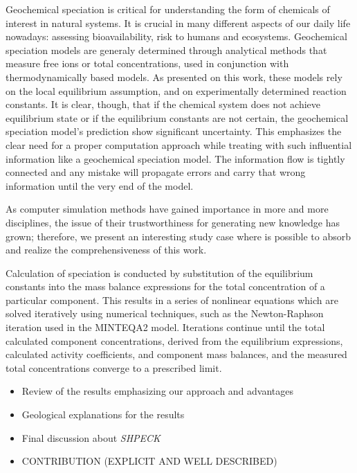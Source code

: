 \documentclass[ppgc,mestrado,English]{iiufrgs}
\begin{document}
Geochemical speciation is critical for understanding the form of chemicals of interest in natural systems. It is crucial in many different aspects of our daily life nowadays: assessing bioavailability, risk to humans and ecosystems. Geochemical speciation models are generaly determined through analytical methods that measure free ions or total concentrations, used in conjunction with thermodynamically based models. As presented on this work, these models rely on the local equilibrium assumption, and on experimentally determined reaction constants. It is clear, though, that if the chemical system does not achieve equilibrium state or if the equilibrium constants are not certain, the geochemical speciation model's prediction show significant uncertainty.
This emphasizes the clear need for a proper computation approach while treating with such influential information like a geochemical speciation model. The information flow is tightly connected and any mistake will propagate errors and carry that wrong information until the very end of the model.

As computer simulation methods have gained importance in more and more disciplines, the issue of their trustworthiness for generating new knowledge has grown; therefore, we present an interesting study case where is possible to absorb and realize the comprehensiveness of this work.

Calculation of speciation is conducted by substitution of the equilibrium constants into the mass balance expressions for the total concentration of a particular component. This results in a series of nonlinear equations which are solved iteratively using numerical techniques, such as the Newton-Raphson iteration used in the MINTEQA2 model. Iterations continue until the total calculated component concentrations, derived from the equilibrium expressions, calculated activity coefficients, and component mass balances, and the measured total concentrations converge to a prescribed limit.

\begin{itemize}
\item Review of the results emphasizing our approach and advantages
\item  Geological explanations for the results
\item  Final discussion about \emph{SHPECK}
\item  CONTRIBUTION (EXPLICIT AND WELL DESCRIBED) 
\end{itemize}
\end{document}

